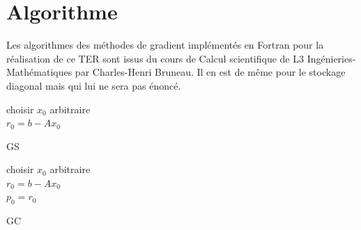 \documentclass[twoside,12pt]{report}
\theoremstyle{remark}
\begin{document}
\section{Algorithme}

Les algorithmes des méthodes de gradient implémentés en Fortran pour la réalisation de ce TER sont issus du cours de Calcul scientifique de L3 Ingénieries-Mathématiques par Charles-Henri Bruneau. Il en est de même pour le stockage diagonal mais qui lui ne sera pas énoncé.

\label{gradsimple}
\begin{center}
\begin{minipage}[t]{0.4\textwidth}
\begin{algorithm}[H]
choisir $x_0$ arbitraire\\
$r_0=b-Ax_0$\\
\vspace{0.1cm}
\caption{GS}
\end{algorithm}
\end{minipage}
\end{center}

\label{gradconju}
\begin{center}
\begin{minipage}[t]{0.4\textwidth}
\begin{algorithm}[H]
choisir $x_0$ arbitraire\\
$r_0=b-Ax_0$\\
$p_0=r_0$\\
\caption{GC}
\end{algorithm}
\end{minipage}
\end{center}
\end{document}
